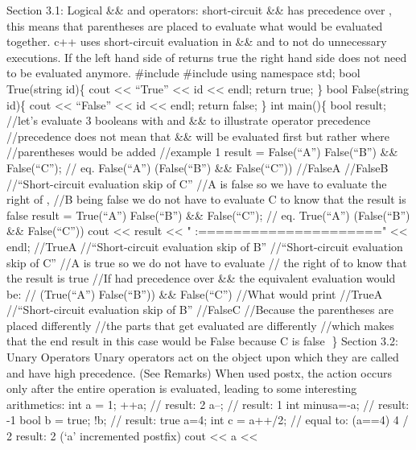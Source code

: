 Section 3.1: Logical \&\& and \textbar\textbar{} operators:
short-circuit \&\& has precedence over \textbar\textbar, this means that
parentheses are placed to evaluate what would be evaluated together. c++
uses short-circuit evaluation in \&\& and \textbar\textbar{} to not do
unnecessary executions. If the left hand side of \textbar\textbar{}
returns true the right hand side does not need to be evaluated anymore.
\#include \#include using namespace std; bool True(string id)\{ cout
\textless\textless{} ``True'' \textless\textless{} id
\textless\textless{} endl; return true; \} bool False(string id)\{ cout
\textless\textless{} ``False'' \textless\textless{} id
\textless\textless{} endl; return false; \} int main()\{ bool result;
//let's evaluate 3 booleans with \textbar\textbar{} and \&\& to
illustrate operator precedence //precedence does not mean that \&\& will
be evaluated first but rather where //parentheses would be added
//example 1 result = False(``A'') \textbar\textbar{} False(``B'') \&\&
False(``C''); // eq. False(``A'') \textbar\textbar{} (False(``B'') \&\&
False(``C'')) //FalseA //FalseB //``Short-circuit evaluation skip of C''
//A is false so we have to evaluate the right of \textbar\textbar, //B
being false we do not have to evaluate C to know that the result is
false result = True(``A'') \textbar\textbar{} False(``B'') \&\&
False(``C''); // eq. True(``A'') \textbar\textbar{} (False(``B'') \&\&
False(``C'')) cout \textless\textless{} result \textless\textless{} "
:=====================" \textless\textless{} endl; //TrueA
//``Short-circuit evaluation skip of B'' //``Short-circuit evaluation
skip of C'' //A is true so we do not have to evaluate // the right of
\textbar\textbar{} to know that the result is true //If
\textbar\textbar{} had precedence over \&\& the equivalent evaluation
would be: // (True(``A'') \textbar\textbar{} False(``B'')) \&\&
False(``C'') //What would print //TrueA //``Short-circuit evaluation
skip of B'' //FalseC //Because the parentheses are placed differently
//the parts that get evaluated are differently //which makes that the
end result in this case would be False because C is false \} Section
3.2: Unary Operators Unary operators act on the object upon which they
are called and have high precedence. (See Remarks) When used postx, the
action occurs only after the entire operation is evaluated, leading to
some interesting arithmetics: int a = 1; ++a; // result: 2 a--; //
result: 1 int minusa=-a; // result: -1 bool b = true; !b; // result:
true a=4; int c = a++/2; // equal to: (a==4) 4 / 2 result: 2 (`a'
incremented postfix) cout \textless\textless{} a \textless\textless{}
